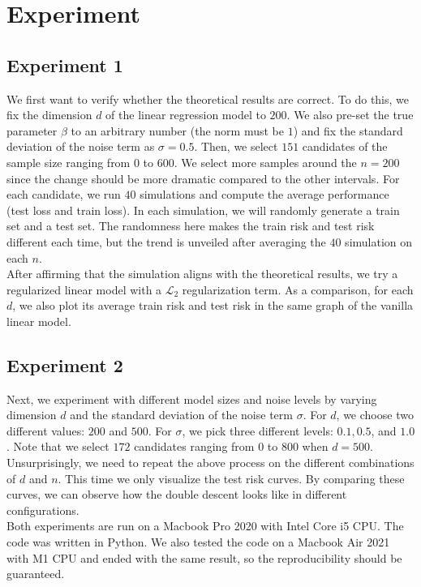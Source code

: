 \documentclass{article}
\begin{document}
\section{Experiment} \label{Experiment}
\subsection{Experiment 1}
We first want to verify whether the theoretical results are correct. To do this, we fix the dimension $d$ of the linear regression model to $200$. We also pre-set the true parameter $\beta$ to an arbitrary number (the norm must be $1$) and fix the standard deviation of the noise term as $\sigma = 0.5$. Then, we select $151$ candidates of the sample size ranging from $0$ to $600$. We select more samples around the $n = 200$ since the change should be more dramatic compared to the other intervals. For each candidate, we run $40$ simulations and compute the average performance (test loss and train loss). In each simulation, we will randomly generate a train set and a test set. The randomness here makes the train risk and test risk different each time, but the trend is unveiled after averaging the $40$ simulation on each $n$.\\

\vspace{-4mm}
After affirming that the simulation aligns with the theoretical results, we try a regularized linear model with a $\mathcal{L}_2$ regularization term. As a comparison, for each $d$, we also plot its average train risk and test risk in the same graph of the vanilla linear model.

\subsection{Experiment 2}
Next, we experiment with different model sizes and noise levels by varying dimension $d$ and the standard deviation of the noise term $\sigma$. For $d$, we choose two different values: $200$ and $500$. For $\sigma$, we pick three different levels: $0.1, 0.5$, and $1.0$. Note that we select $172$ candidates ranging from $0$ to $800$ when $d = 500$. Unsurprisingly, we need to repeat the above process on the different combinations of $d$ and $n$. This time we only visualize the test risk curves. By comparing these curves, we can observe how the double descent looks like in different configurations.\\

\vspace{-4mm}
Both experiments are run on a Macbook Pro 2020 with Intel Core i5 CPU. The code was written in Python. We also tested the code on a Macbook Air 2021 with M1 CPU and ended with the same result, so the reproducibility should be guaranteed.
\end{document}
